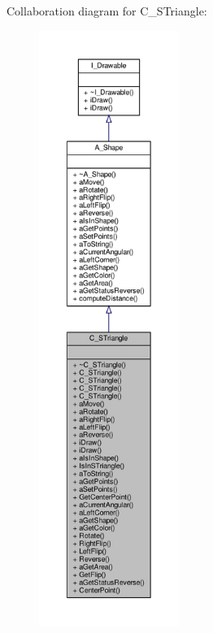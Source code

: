 Collaboration diagram for C\+\_\+\+S\+Triangle\+:
\nopagebreak
\begin{figure}[H]
\begin{center}
\leavevmode
\includegraphics[height=550pt]{classC__STriangle__coll__graph}
\end{center}
\end{figure}
